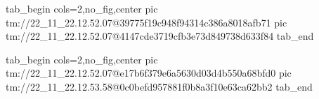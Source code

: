  
 
 
 
 

\qqSecOrig


\ifcmt
  tab_begin cols=2,no_fig,center
    pic tm://22_11_22.12.52.07@39775f19c948f94314c386a8018afb71
    pic tm://22_11_22.12.52.07@4147cde3719cfb3e73d849738d633f84
  tab_end
\fi


\ifcmt
  tab_begin cols=2,no_fig,center
    pic tm://22_11_22.12.52.07@e17b6f379e6a5630d03d4b550a68bfd0
    pic tm://22_11_22.12.53.58@0c0befd957881f0b8a3f10e63ca62bb2
  tab_end
\fi

